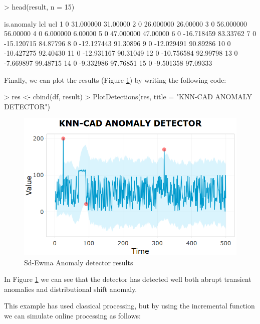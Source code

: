 \documentclass[a4paper]{article}
\begin{document}
\begin{Schunk}
\begin{Sinput}
> head(result, n = 15)
\end{Sinput}
\begin{Soutput}
   is.anomaly        lcl      ucl
1           0  31.000000 31.00000
2           0  26.000000 26.00000
3           0  56.000000 56.00000
4           0   6.000000  6.00000
5           0  47.000000 47.00000
6           0 -16.718459 83.33762
7           0 -15.120715 84.87796
8           0 -12.127443 91.30896
9           0 -12.029491 90.89286
10          0 -10.427275 92.40430
11          0 -12.931167 90.31049
12          0 -10.756584 92.99798
13          0  -7.669897 99.48715
14          0  -9.332986 97.76851
15          0  -9.501358 97.09333
\end{Soutput}
\end{Schunk}

Finally, we can plot the results (Figure \ref{fig:result}) by writing the following code:

\begin{Schunk}
\begin{Sinput}
> res <- cbind(df, result)
> PlotDetections(res, title = "KNN-CAD ANOMALY DETECTOR")
\end{Sinput}
\end{Schunk}

\begin{figure}[htbp]
\centering
\includegraphics[width=0.5\linewidth]{sdEwmaresult.PNG}
\caption{Sd-Ewma Anomaly detector results}
\label{fig:result}
\end{figure}

In Figure \ref{fig:result} we can see that the detector has detected well both abrupt transient anomalies  and distributional shift anomaly.

This example has used classical processing, but by using the incremental function we can simulate online processing as follows:

\begin{Schunk}
\end{Schunk}
\end{document}
